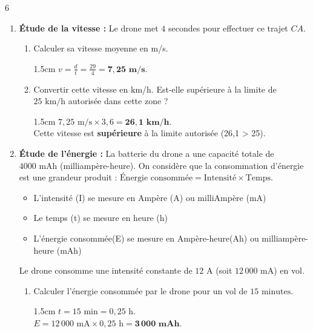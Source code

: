 \documentclass[a4paper]{book}
\begin{document}
{\begin{exerciceNote}{6}
\begin{enumerate}[leftmargin=*]
\vfill

\hfill Tourner la page !

\newpage
            
            \item \textbf{Étude de la vitesse :} Le drone met $4$ secondes pour effectuer ce trajet $CA$. 
            \begin{enumerate}
                \item Calculer sa vitesse moyenne en m/s.
                \begin{ZoneReponse}{1.5cm}                
                $v = \frac{d}{t} = \frac{29}{4} = \mathbf{7,25 \text{ m/s}}$.
                \end{ZoneReponse}
                
                \item Convertir cette vitesse en km/h. Est-elle supérieure à la limite de $25\text{ km/h}$ autorisée dans cette zone ?
                \begin{ZoneReponse}{1.5cm}                
                $7,25 \text{ m/s} \times 3,6 = \mathbf{26,1 \text{ km/h}}$. \\
                Cette vitesse est \textbf{supérieure} à la limite autorisée (26,1 > 25).
                \end{ZoneReponse}
            \end{enumerate}
        
            \item \textbf{Étude de l'énergie :} 
            La batterie du drone a une capacité totale de $4000\text{ mAh}$ (milliampère-heure). 
            On considère que la consommation d'énergie est une grandeur produit : $\text{Énergie consommée} = \text{Intensité} \times \text{Temps}$.

            \begin{itemize}
               \item L'intensité (I) se mesure en Ampère (A) ou milliAmpère (mA)
               \item Le temps (t) se mesure en heure (h)
               \item L'énergie consommée(E) se mesure en Ampère-heure(Ah) ou milliampère-heure (mAh)
            \end{itemize}      
            
            Le drone consomme une intensité constante de $12\text{ A}$ (soit $12\,000\text{ mA}$) en vol.
            \begin{enumerate}[leftmargin=*]
                \item Calculer l'énergie consommée par le drone pour un vol de $15\text{ minutes}$.
                \begin{ZoneReponse}{1.5cm}                
                $t = 15 \text{ min} = 0,25 \text{ h}$. \\
                $E = 12\,000 \text{ mA} \times 0,25 \text{ h} = \mathbf{3\,000 \text{ mAh}}$.
                \end{ZoneReponse}
                

\end{enumerate}
\end{enumerate}
\end{exerciceNote}}
\end{document}

